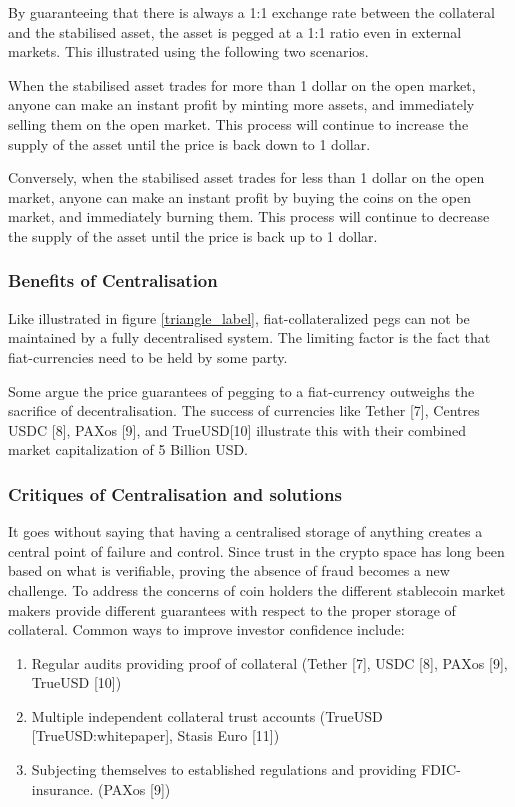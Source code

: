 \documentclass[english,]{IEEEtran}
\providecommand{\tightlist}{%
  \setlength{\itemsep}{0pt}\setlength{\parskip}{0pt}}
\begin{document}
By guaranteeing that there is always a 1:1 exchange rate between the
collateral and the stabilised asset, the asset is pegged at a 1:1 ratio
even in external markets. This illustrated using the following two
scenarios.

When the stabilised asset trades for more than 1 dollar on the open
market, anyone can make an instant profit by minting more assets, and
immediately selling them on the open market. This process will continue
to increase the supply of the asset until the price is back down to 1
dollar.

Conversely, when the stabilised asset trades for less than 1 dollar on
the open market, anyone can make an instant profit by buying the coins
on the open market, and immediately burning them. This process will
continue to decrease the supply of the asset until the price is back up
to 1 dollar.

\subsubsection{Benefits of
Centralisation}\label{benefits-of-centralisation}

Like illustrated in figure \ref{triangle_label}, fiat-collateralized
pegs can not be maintained by a fully decentralised system. The limiting
factor is the fact that fiat-currencies need to be held by some party.

Some argue the price guarantees of pegging to a fiat-currency outweighs
the sacrifice of decentralisation. The success of currencies like Tether
{[}7{]}, Centres USDC {[}8{]}, PAXos {[}9{]}, and TrueUSD{[}10{]}
illustrate this with their combined market capitalization of 5 Billion
USD.

\subsubsection{Critiques of Centralisation and
solutions}\label{critiques-of-centralisation-and-solutions}

It goes without saying that having a centralised storage of anything
creates a central point of failure and control. Since trust in the
crypto space has long been based on what is verifiable, proving the
absence of fraud becomes a new challenge. To address the concerns of
coin holders the different stablecoin market makers provide different
guarantees with respect to the proper storage of collateral. Common ways
to improve investor confidence include:

\begin{enumerate}
\def\labelenumi{\arabic{enumi}.}
\tightlist
\item
  Regular audits providing proof of collateral (Tether {[}7{]}, USDC
  {[}8{]}, PAXos {[}9{]}, TrueUSD {[}10{]})
\item
  Multiple independent collateral trust accounts (TrueUSD
  {[}TrueUSD:whitepaper{]}, Stasis Euro {[}11{]})
\item
  Subjecting themselves to established regulations and providing FDIC-
  insurance. (PAXos {[}9{]})
\end{enumerate}
\end{document}
